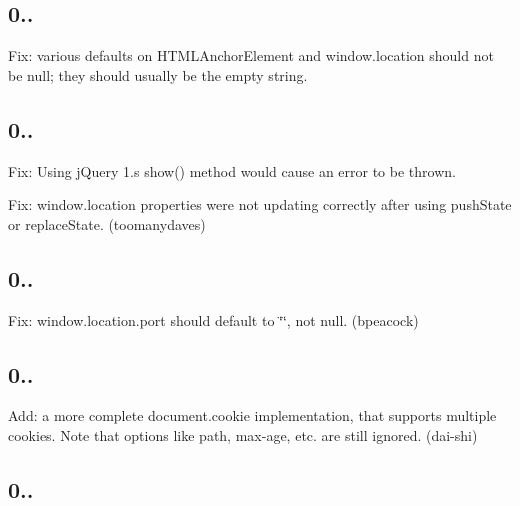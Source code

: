 \subsection*{0..}


\begin{DoxyItemize}
\item Fix\+: various defaults on {\ttfamily H\+T\+M\+L\+Anchor\+Element} and {\ttfamily window.\+location} should not be {\ttfamily null}; they should usually be the empty string.
\end{DoxyItemize}

\subsection*{0..}


\begin{DoxyItemize}
\item Fix\+: Using j\+Query 1.\textquotesingle{}s {\ttfamily show()} method would cause an error to be thrown.
\item Fix\+: {\ttfamily window.\+location} properties were not updating correctly after using {\ttfamily push\+State} or {\ttfamily replace\+State}. (toomanydaves)
\end{DoxyItemize}

\subsection*{0..}


\begin{DoxyItemize}
\item Fix\+: {\ttfamily window.\+location.\+port} should default to {\ttfamily \char`\"{}\char`\"{}}, not {\ttfamily null}. (bpeacock)
\end{DoxyItemize}

\subsection*{0..}


\begin{DoxyItemize}
\item Add\+: a more complete {\ttfamily document.\+cookie} implementation, that supports multiple cookies. Note that options like {\ttfamily path}, {\ttfamily max-\/age}, etc. are still ignored. (dai-\/shi)
\end{DoxyItemize}

\subsection*{0..}


